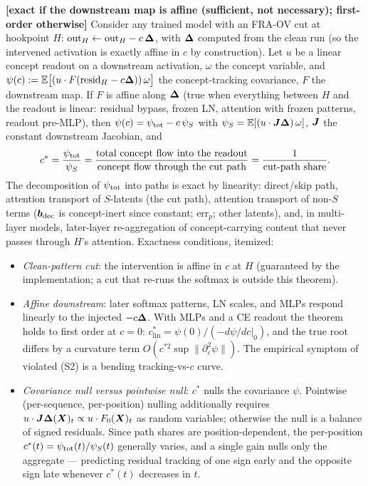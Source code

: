 \documentclass{article}
\begin{document}
\begin{theorem}\label{thm:pathshare}
\textbf{[exact if the downstream map is affine (sufficient, not necessary); first-order otherwise]} Consider any trained model with an FRA-OV cut at hookpoint $H$: $\mathrm{out}_H \leftarrow \mathrm{out}_H - c\,\boldsymbol{\Delta}$, with $\boldsymbol{\Delta}$ computed from the clean run (so the intervened activation is exactly affine in $c$ by construction). Let $u$ be a linear concept readout on a downstream activation, $\omega$ the concept variable, and $\psi(c) := \mathbb{E}\big[(u\cdot F(\mathrm{resid}_H - c\boldsymbol{\Delta}))\,\omega\big]$ the concept-tracking covariance, $F$ the downstream map. If $F$ is affine along $\boldsymbol{\Delta}$ (true when everything between $H$ and the readout is linear: residual bypass, frozen LN, attention with frozen patterns, readout pre-MLP), then $\psi(c) = \psi_{\mathrm{tot}} - c\,\psi_S$ with $\psi_S = \mathbb{E}[(u\cdot\boldsymbol{J}\boldsymbol{\Delta})\,\omega]$, $\boldsymbol{J}$ the constant downstream Jacobian, and
\begin{equation}\label{eq:cstar}
    c^* = \frac{\psi_{\mathrm{tot}}}{\psi_S}
    = \frac{\text{total concept flow into the readout}}{\text{concept flow through the cut path}}
    = \frac{1}{\text{cut-path share}} .
\end{equation}
The decomposition of $\psi_{\mathrm{tot}}$ into paths is exact by linearity: direct/skip path, attention transport of $S$-latents (the cut path), attention transport of non-$S$ terms ($\boldsymbol{b}_{\mathrm{dec}}$ is concept-inert since constant; $\mathrm{err}_p$; other latents), and, in multi-layer models, later-layer re-aggregation of concept-carrying content that never passes through $H$'s attention. Exactness conditions, itemized:
\begin{itemize}
    \item[\textbf{(S1)}] \emph{Clean-pattern cut}: the intervention is affine in $c$ at $H$ (guaranteed by the implementation; a cut that re-runs the softmax is outside this theorem).
    \item[\textbf{(S2)}] \emph{Affine downstream}: later softmax patterns, LN scales, and MLPs respond linearly to the injected $-c\boldsymbol{\Delta}$. With MLPs and a CE readout the theorem holds to first order at $c = 0$: $c^*_{\mathrm{lin}} = \psi(0)/(-d\psi/dc|_0)$, and the true root differs by a curvature term $O(c^{*2}\sup\|\partial_c^2\psi\|)$. The empirical symptom of violated (S2) is a bending tracking-vs-$c$ curve.
    \item[\textbf{(S3)}] \emph{Covariance null versus pointwise null}: $c^*$ nulls the covariance $\psi$. Pointwise (per-sequence, per-position) nulling additionally requires $u\cdot\boldsymbol{J}\boldsymbol{\Delta}(\boldsymbol{X})_t \propto u\cdot F_0(\boldsymbol{X})_t$ as random variables; otherwise the null is a balance of signed residuals. Since path shares are position-dependent, the per-position $c^*(t) = \psi_{\mathrm{tot}}(t)/\psi_S(t)$ generally varies, and a single gain nulls only the aggregate --- predicting residual tracking of one sign early and the opposite sign late whenever $c^*(t)$ decreases in $t$.
\end{itemize}
\end{theorem}
\end{document}
